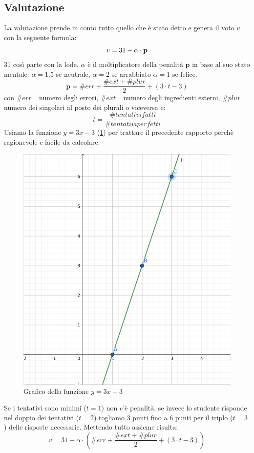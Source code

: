 \subsection{Valutazione}
La valutazione prende in conto tutto quello che è stato detto e genera il voto $v$ con la seguente formula:
\[
v = 31 - \alpha \cdot \textbf{p} \\
\]
31 così parte con la lode, $\alpha$ è il moltiplicatore della penalità $\textbf{p}$ in base al suo stato mentale: $\alpha = 1.5$ se neutrale, $\alpha=2$ se arrabbiato $\alpha = 1$ se felice.
\[
\textbf{p} = \#err + \frac{\#ext + \#plur}{2} + (3\cdot t - 3)
\]
con $\#err$= numero degli errori, $\#ext$= numero degli ingredienti esterni, $\#plur$ = numero dei singolari al posto dei plurali o viceversa e:
\[
t = \frac{\#tentativi fatti}{\# tentativi perfetti}
\]
Usiamo la funzione $y = 3x -3$  (\ref{fig:FunzioneVoto}) per trattare il precedente rapporto perchè ragionevole e facile da calcolare.
\begin{figure}[ht]
\centerline{\includegraphics[scale=0.25]{Images/3x-3.png}}
\caption{Grafico della funzione $y = 3x -3$}
\label{fig:FunzioneVoto}
\end{figure}
Se i tentativi sono minimi ($t=1$) non c'è penalità, se invece lo studente risponde nel doppio dei tentativi ($t=2$) togliamo 3 punti fino a 6 punti per il triplo ($t=3$) delle risposte necessarie.
\newline
Mettendo tutto assieme risulta:
\[
v = 31 - \alpha \cdot (\#err + \frac{\#ext + \#plur}{2} + (3\cdot t - 3))
\]